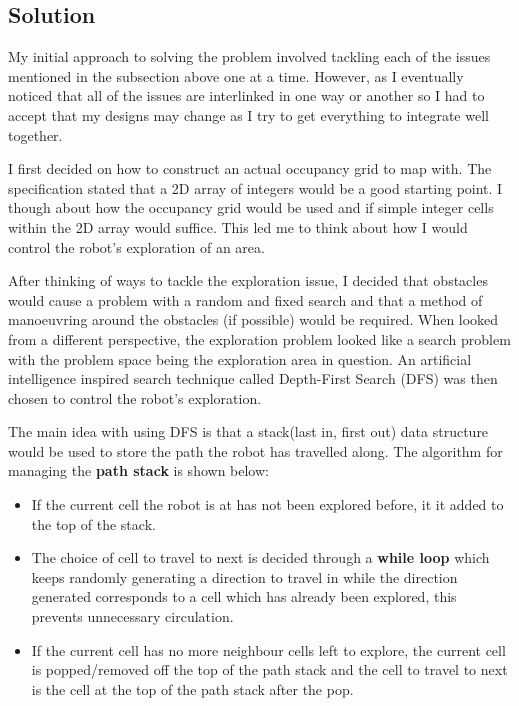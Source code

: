 \documentclass[a4paper,12pt]{article}
\begin{document}
\subsection{Solution}
\noindent My initial approach to solving the problem involved tackling each of the issues mentioned in the subsection above one at a time. However, as I eventually noticed that all of the issues are interlinked in one way or another so I had to accept that my designs may change as I try to get everything to integrate well together.

\vspace{5mm}
\noindent I first decided on how to construct an actual occupancy grid to map with. The specification stated that a 2D array of integers would be a good starting point. I though about how the occupancy grid would be used and if simple integer cells within the 2D array would suffice. This led me to think about how I would control the robot's exploration of an area.

\vspace{5mm}
\noindent After thinking of ways to tackle the exploration issue, I decided that obstacles would cause a problem with a random and fixed search and that a method of manoeuvring around the obstacles (if possible) would be required. When looked from a different perspective, the exploration problem looked like a search problem with the problem space being the exploration area in question. An artificial intelligence inspired search technique called Depth-First Search (DFS) was then chosen to control the robot's exploration.

\vspace{5mm}
\noindent The main idea with using DFS is that a stack(last in, first out) data structure would be used to store the path the robot has travelled along. The algorithm for managing the \textbf{path stack} is shown below:

\begin{itemize}
	\item If the current cell the robot is at has not been explored before, it it added to the top of the stack.
	\item The choice of cell to travel to next is decided through a \textbf{while loop} which keeps randomly generating a direction to travel in while the direction generated corresponds to a cell which has already been explored, this prevents unnecessary circulation.
	\item If the current cell has no more neighbour cells left to explore, the current cell is popped/removed off the top of the path stack and the cell to travel to next is the cell at the top of the path stack after the pop.
\end{itemize}
\end{document}
